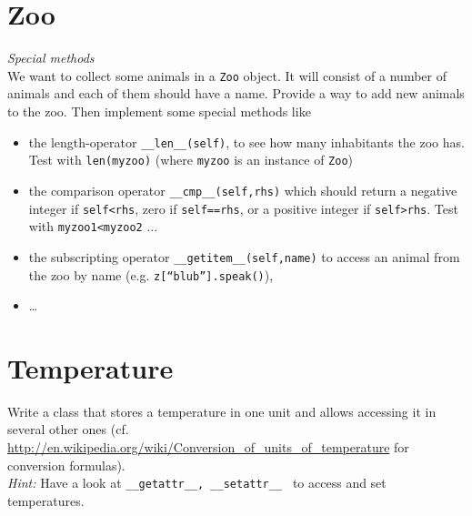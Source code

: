 \documentclass[12pt]{article}
\begin{document}
\section{Zoo}
\textit{Special methods}\\
We want to collect some animals in a \texttt{Zoo} object. It will consist of a number of animals and each of them should have a name. Provide a way to add new animals to the zoo. Then implement some special methods like
\begin{itemize}
\item the length-operator \texttt{\_\_len\_\_(self)}, to see how many inhabitants the zoo has. Test with \texttt{len(myzoo)} (where \texttt{myzoo} is an instance of \texttt{Zoo})
\item the comparison operator \texttt{\_\_cmp\_\_(self,rhs)} which should return a negative integer if \texttt{self<rhs}, zero if \texttt{self==rhs}, or a positive integer if \texttt{self>rhs}. Test with \texttt{myzoo1<myzoo2} ...
\item the subscripting operator \texttt{\_\_getitem\_\_(self,name)} to access an animal from the zoo by name (e.g. \texttt{z[``blub''].speak()}),
\item \dots
\end{itemize}


\section{Temperature}

Write a class that stores a temperature in one unit and allows accessing it in
several other ones
(cf. \url{http://en.wikipedia.org/wiki/Conversion_of_units_of_temperature} for
conversion formulas).\\
\emph{Hint:} Have a look at \texttt{\_\_getattr\_\_, \_\_setattr\_\_ } to
access and set temperatures.
\end{document}
